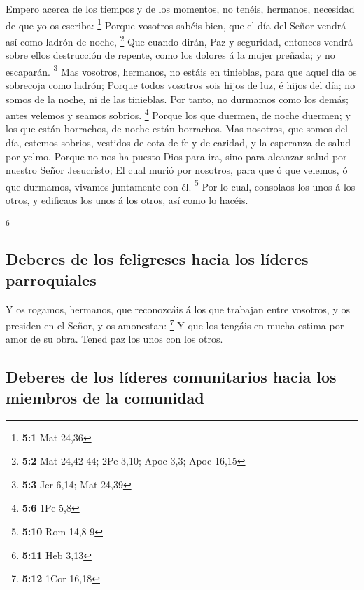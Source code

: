  Empero acerca de los tiempos y de los momentos, no tenéis,
hermanos, necesidad de que yo os escriba: \footnote{\textbf{5:1} Mat
  24,36}  Porque vosotros sabéis bien, que el día del Señor
vendrá así como ladrón de noche, \footnote{\textbf{5:2} Mat 24,42-44;
  2Pe 3,10; Apoc 3,3; Apoc 16,15}  Que cuando dirán, Paz y
seguridad, entonces vendrá sobre ellos destrucción de repente, como los
dolores á la mujer preñada; y no escaparán. \footnote{\textbf{5:3} Jer
  6,14; Mat 24,39}  Mas vosotros, hermanos, no estáis en
tinieblas, para que aquel día os sobrecoja como ladrón; 
Porque todos vosotros sois hijos de luz, é hijos del día; no somos de la
noche, ni de las tinieblas.  Por tanto, no durmamos como los
demás; antes velemos y seamos sobrios. \footnote{\textbf{5:6} 1Pe 5,8}
 Porque los que duermen, de noche duermen; y los que están
borrachos, de noche están borrachos.  Mas nosotros, que
somos del día, estemos sobrios, vestidos de cota de fe y de caridad, y
la esperanza de salud por yelmo.  Porque no nos ha puesto
Dios para ira, sino para alcanzar salud por nuestro Señor Jesucristo;
 El cual murió por nosotros, para que ó que velemos, ó que
durmamos, vivamos juntamente con él. \footnote{\textbf{5:10} Rom 14,8-9}
 Por lo cual, consolaos los unos á los otros, y edificaos
los unos á los otros, así como lo hacéis.

\footnote{\textbf{5:11} Heb 3,13}

\hypertarget{deberes-de-los-feligreses-hacia-los-luxedderes-parroquiales}{%
\subsection{Deberes de los feligreses hacia los líderes
parroquiales}\label{deberes-de-los-feligreses-hacia-los-luxedderes-parroquiales}}

 Y os rogamos, hermanos, que reconozcáis á los que trabajan
entre vosotros, y os presiden en el Señor, y os amonestan: \footnote{\textbf{5:12}
  1Cor 16,18}  Y que los tengáis en mucha estima por amor
de su obra. Tened paz los unos con los otros.

\hypertarget{deberes-de-los-luxedderes-comunitarios-hacia-los-miembros-de-la-comunidad}{%
\subsection{Deberes de los líderes comunitarios hacia los miembros de la
comunidad}\label{deberes-de-los-luxedderes-comunitarios-hacia-los-miembros-de-la-comunidad}}

